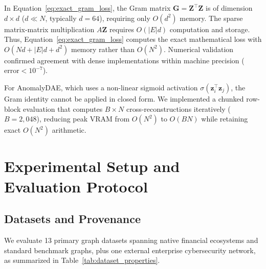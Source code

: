 \documentclass[11pt,a4paper]{article}
\begin{document}
In Equation~\eqref{eq:exact_gram_loss}, the Gram matrix $\mathbf{G} = \mathbf{Z}^\top \mathbf{Z}$ is of dimension $d \times d$ ($d \ll N$, typically $d=64$), requiring only $O(d^2)$ memory. The sparse matrix-matrix multiplication $A \mathbf{Z}$ requires $O(|E|d)$ computation and storage. Thus, Equation~\eqref{eq:exact_gram_loss} computes the exact mathematical loss with $O(N d + |E| d + d^2)$ memory rather than $O(N^2)$. Numerical validation confirmed agreement with dense implementations within machine precision ($\text{error} < 10^{-7}$).

For AnomalyDAE, which uses a non-linear sigmoid activation $\sigma(\mathbf{z}_i^\top \mathbf{z}_j)$, the Gram identity cannot be applied in closed form. We implemented a chunked row-block evaluation that computes $B \times N$ cross-reconstructions iteratively ($B=2,048$), reducing peak VRAM from $O(N^2)$ to $O(B N)$ while retaining exact $O(N^2)$ arithmetic.

\section{Experimental Setup and Evaluation Protocol}
\label{sec:experimental_setup}

\subsection{Datasets and Provenance}
We evaluate 13 primary graph datasets spanning native financial ecosystems and standard benchmark graphs, plus one external enterprise cybersecurity network, as summarized in Table~\ref{tab:dataset_properties}.
\end{document}
